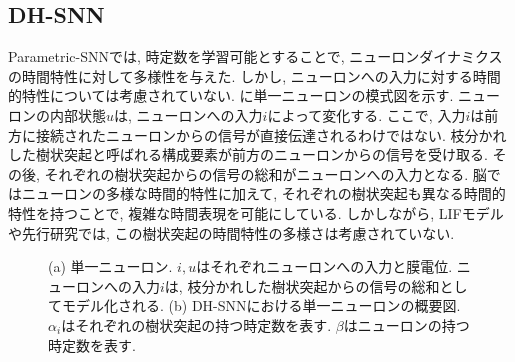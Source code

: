 \subsection{DH-SNN}
Parametric-SNNでは, 時定数を学習可能とすることで, ニューロンダイナミクスの時間特性に対して多様性を与えた.
しかし, ニューロンへの入力に対する時間的特性については考慮されていない.
に単一ニューロンの模式図を示す.
ニューロンの内部状態$u$は, ニューロンへの入力$i$によって変化する.
ここで, 入力$i$は前方に接続されたニューロンからの信号が直接伝達されるわけではない.
枝分かれした樹状突起と呼ばれる構成要素が前方のニューロンからの信号を受け取る.
その後, それぞれの樹状突起からの信号の総和がニューロンへの入力となる.
脳ではニューロンの多様な時間的特性に加えて, それぞれの樹状突起も異なる時間的特性を持つことで, 複雑な時間表現を可能にしている.
しかしながら, LIFモデルや先行研究では, この樹状突起の時間特性の多様さは考慮されていない.
\begin{figure}
    \centering

    \parbox{1.0\textwidth}{
        \centering

        \begin{minipage}{0.42325\textwidth}
            
            \label{fig:single:neuron}
        \end{minipage}
        \hspace{0.02\textwidth}
        \begin{minipage}{0.477\textwidth}
            
            \label{fig:dhsnn}
        \end{minipage}

        \caption[DH-SNNにおける単一ニューロンの模式図]{
            \cite{dhsnn}
            (a) 単一ニューロン. $i, u$はそれぞれニューロンへの入力と膜電位. 
            ニューロンへの入力$i$は, 枝分かれした樹状突起からの信号の総和としてモデル化される.
            (b) DH-SNNにおける単一ニューロンの概要図.
            $\alpha_i$はそれぞれの樹状突起の持つ時定数を表す.
            $\beta$はニューロンの持つ時定数を表す.
        }
    }


\end{figure}

